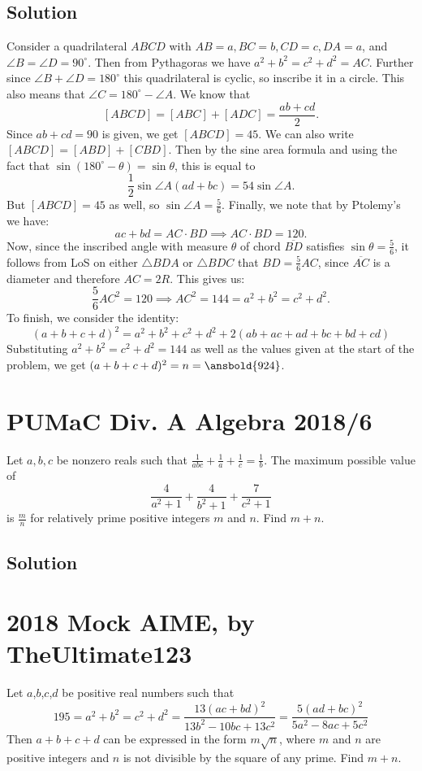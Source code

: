 \documentclass{article}
\begin{document}
\subsection{Solution}
Consider a quadrilateral $ABCD$ with $AB=a,BC=b,CD=c,DA=a$, and $\angle B=\angle D=90^\circ$. Then from Pythagoras we have $a^2+b^2=c^2+d^2=AC$. Further since $\angle B+\angle D=180^\circ$ this quadrilateral is cyclic, so inscribe it in a circle. This also means that $\angle C=180^\circ-\angle A$. We know that
$$[ABCD]=[ABC]+[ADC]=\frac{ab+cd}{2}.$$
Since $ab+cd=90$ is given, we get $[ABCD]=45$. We can also write $[ABCD]=[ABD]+[CBD]$. Then by the sine area formula and using the fact that $\sin(180^\circ - \theta) = \sin \theta$, this is equal to
$$\frac{1}{2}\sin \angle A (ad+bc)=54 \sin \angle A.$$
But $[ABCD]=45$ as well, so $\sin \angle A=\frac{5}{6}$. Finally, we note that by Ptolemy's we have:
$$ac+bd=AC\cdot BD \implies AC \cdot BD=120.$$
Now, since the inscribed angle with measure $\theta$ of chord $\overline{BD}$ satisfies $\sin \theta = \frac{5}{6}$, it follows from LoS on either $\triangle BDA$ or $\triangle BDC$ that $BD=\frac{5}{6}AC$, since $\overline{AC}$ is a diameter and therefore $AC=2R$. This gives us:
$$\frac{5}{6}AC^2=120 \implies AC^2=144=a^2+b^2=c^2+d^2.$$
To finish, we consider the identity:
$$(a+b+c+d)^2=a^2+b^2+c^2+d^2+2(ab+ac+ad+bc+bd+cd)$$
Substituting $a^2+b^2=c^2+d^2=144$ as well as the values given at the start of the problem, we get $(a+b+c+d)^2=n=\ansbold{924}$.

\pagebreak\section{PUMaC Div. A Algebra 2018/6}
Let $a,b,c$ be nonzero reals such that $\frac{1}{abc}+\frac{1}{a}+\frac{1}{c}=\frac{1}{b}.$ The maximum possible value of $$\frac{4}{a^2+1}+\frac{4}{b^2+1}+\frac{7}{c^2+1}$$ is $\frac{m}{n}$ for relatively prime positive integers $m$ and $n.$ Find $m+n.$

\subsection{Solution}

\pagebreak\section{2018 Mock AIME, by TheUltimate123}
Let $a$,$b$,$c$,$d$ be positive real numbers such that \[195=a^2+b^2=c^2+d^2=\frac{13(ac+bd)^2}{13b^2-10bc+13c^2}=\frac{5(ad+bc)^2}{5a^2-8ac+5c^2}\] Then $a+b+c+d$ can be expressed in the form $m\sqrt{n}$, where $m$ and $n$ are positive integers and $n$ is not divisible by the square of any prime. Find $m+n$.
\end{document}

